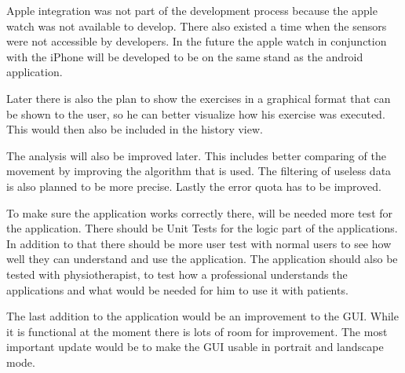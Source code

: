 Apple integration was not part of the development process because the apple watch was not available to develop. There also existed a time when the sensors were not accessible by developers. In the future the apple watch in conjunction with the iPhone will be developed to be on the same stand as the android application.

Later there is also the plan to show the exercises in a graphical format that can be shown to the user, so he can better visualize how his exercise was executed. This would then also be included in the history view.

The analysis will also be improved later. This includes better comparing of the movement by improving the algorithm that is used. The filtering of useless data is also planned to be more precise. Lastly the error quota has to be improved.

To make sure the application works correctly there, will be needed more test for the application. There should be Unit Tests for the logic part of the applications. In addition to that there should be more user test with normal users to see how well they can understand and use the application. The application should also be tested with physiotherapist, to test how a professional understands the applications and what would be needed for him to use it with patients.

The last addition to the application would be an improvement to the GUI. While it is functional at the moment there is lots of room for improvement. The most important update would be to make the GUI usable in portrait and landscape mode.

